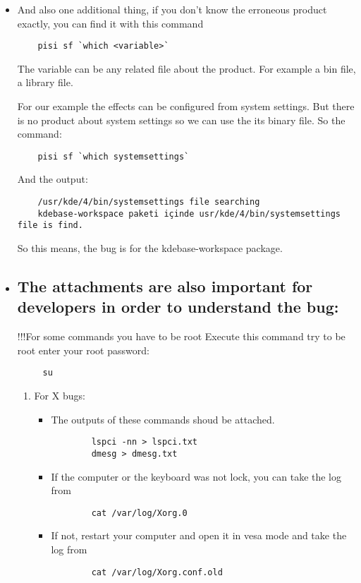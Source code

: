 \documentclass[a4paper,10pt]{article}
\begin{document}
\begin{itemize}
  	\item And also one additional thing, if you don't know the erroneous product exactly, you can find it with this command
	\begin{verbatim}
	pisi sf `which <variable>`
	\end{verbatim}
	The variable can be any related file about the product. For example a bin file, a library file.

	For our example the effects can be configured from system settings. But there is no product about system settings so we can use the its binary file. So the command:
	\begin{verbatim}
	pisi sf `which systemsettings`
	\end{verbatim}

	And the output:
	\begin{verbatim}
	/usr/kde/4/bin/systemsettings file searching
	kdebase-workspace paketi içinde usr/kde/4/bin/systemsettings file is find.
	\end{verbatim}
	So this means, the bug is for the kdebase-workspace package.

  \item \subsection*{The attachments are also important for developers in order to understand the bug:}

	!!!For some commands you have to be root
	Execute this command try to be root enter your root password:
	\begin{verbatim}
	 su
	\end{verbatim}

	\begin{enumerate}
	\item For X bugs:
	\begin{itemize}
		\item The outputs of these commands shoud be attached.
		\begin{verbatim}
		lspci -nn > lspci.txt
		dmesg > dmesg.txt
		\end{verbatim}
		\item If the computer or the keyboard was not lock, you can take the log from 
		\begin{verbatim}
		cat /var/log/Xorg.0
		\end{verbatim}
		\item If not, restart your computer and open it in vesa mode and take the log from
		\begin{verbatim}
		cat /var/log/Xorg.conf.old
		\end{verbatim}


\end{itemize}
\end{enumerate}
\end{itemize}
\end{document}

